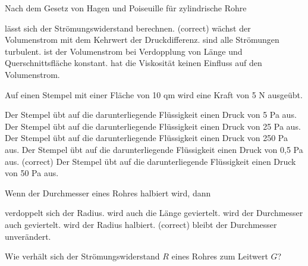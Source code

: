 \documentclass[11pt]{exam}
\begin{document}
\setlength{\voffset}{-0.5in}
\setlength{\headsep}{5pt}

\hspace{2mm}
 \hspace{5mm}
\vspace{4mm}

\begin{questions}

\question Nach dem Gesetz von Hagen und Poiseuille für zylindrische Rohre

\begin{choices}
	\choice lässt sich der Strömungswiderstand berechnen. (correct)
	\choice wächst der Volumenstrom mit dem Kehrwert der Druckdifferenz.
	\choice sind alle Strömungen turbulent.
	\choice ist der Volumenstrom bei Verdopplung von Länge und Querschnittsfläche konstant.
	\choice hat die Viskosität keinen Einfluss auf den Volumenstrom.
\end{choices}

\vspace{3mm}\question Auf einen Stempel mit einer Fläche von 10 qm wird eine Kraft von 5 N ausgeübt.

\begin{choices}
	\choice Der Stempel übt auf die darunterliegende Flüssigkeit einen Druck von 5 Pa aus.
	\choice Der Stempel übt auf die darunterliegende Flüssigkeit einen Druck von 25 Pa aus.
	\choice Der Stempel übt auf die darunterliegende Flüssigkeit einen Druck von 250 Pa aus.
	\choice Der Stempel übt auf die darunterliegende Flüssigkeit einen Druck von 0,5 Pa aus. (correct)
	\choice Der Stempel übt auf die darunterliegende Flüssigkeit einen Druck von 50 Pa aus.
\end{choices}

\vspace{3mm}\question Wenn der Durchmesser eines Rohres halbiert wird, dann

\begin{choices}
	\choice verdoppelt sich der Radius.
	\choice wird auch die Länge geviertelt.
	\choice wird der Durchmesser auch geviertelt.
	\choice wird der Radius halbiert. (correct)
	\choice bleibt der Durchmesser unverändert.
\end{choices}

\vspace{3mm}\question Wie verhält sich der Strömungswiderstand \(R\) eines Rohres zum Leitwert \(G\)?


\end{questions}
\end{document}
